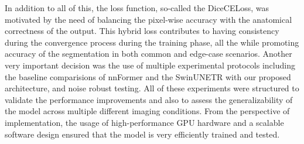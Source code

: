 In addition to all of this, the loss function, so-called the DiceCELoss, was motivated by the need of balancing the pixel-wise accuracy with the anatomical correctness of the output. This hybrid loss contributes to having consistency during the convergence process during the training phase, all the while promoting accuracy of the segmentation in both common and edge-case scenarios. Another very important decision was the use of multiple experimental protocols including the baseline comparisions of nnFormer and the SwinUNETR with our proposed architecture, and noise robust testing. All of these experiments were structured to validate the performance improvements and also to assess the generalizability of the model across multiple different imaging conditions. From the perspective of implementation, the usage of high-performance GPU hardware and a scalable software design ensured that the model is very efficiently trained and tested.

